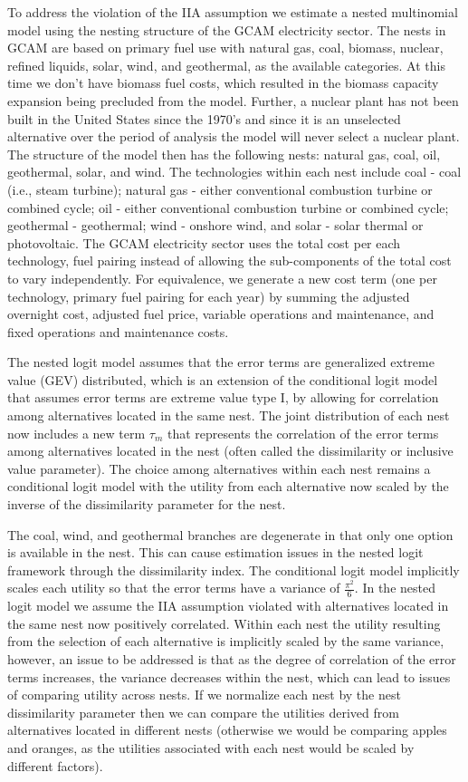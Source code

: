 \documentclass[10pt]{amsart}
\begin{document}
To address the violation of the IIA assumption we estimate a nested multinomial model using the nesting structure of the GCAM electricity sector.
The nests in GCAM are based on primary fuel use with natural gas, coal, biomass, nuclear, refined liquids, solar, wind, and geothermal, as the available categories.
At this time we don't have biomass fuel costs, which resulted in the biomass capacity expansion being precluded from the model.
Further, a nuclear plant has not been built in the United States since the 1970's and since it is an unselected  alternative over the period of analysis the model will never select a nuclear plant. 
The structure of the model then has the following nests: natural gas, coal, oil, geothermal, solar, and wind. 
The technologies within each nest include coal - coal (i.e., steam turbine); natural gas - either conventional combustion turbine or combined cycle; oil - either conventional combustion turbine or combined cycle; geothermal - geothermal; wind - onshore wind, and solar - solar thermal or photovoltaic. 
The GCAM electricity sector uses the total cost per each technology, fuel pairing instead of allowing the sub-components of the total cost to vary independently.
For equivalence, we generate a new cost term (one per technology, primary fuel pairing for each year) by summing the adjusted overnight cost, adjusted fuel price, variable operations and maintenance, and fixed operations and maintenance costs.

The nested logit model assumes that the error terms are generalized extreme value (GEV) distributed, which is an extension of the conditional logit model that assumes error terms are extreme value type I, by allowing for correlation among alternatives located in the same nest. 
The joint distribution of each nest now includes a new term $\tau_m$ that represents the correlation of the error terms among alternatives located in the nest (often called the dissimilarity or inclusive value parameter). 
The choice among alternatives within each nest remains a conditional logit model with the utility from each alternative now scaled by the inverse of the dissimilarity parameter for the nest.  

The coal, wind, and geothermal branches are degenerate in that only one option is available in the nest.
This can cause estimation issues in the nested logit framework through the dissimilarity index.
The conditional logit model implicitly scales each utility so that the error terms have a variance of $\frac{\pi^2}{6}$.
In the nested logit model we assume the IIA assumption violated with alternatives located in the same nest now positively correlated.
Within each nest the utility resulting from the selection of each alternative is implicitly scaled by the same variance, however, an issue to be addressed is that as the degree of correlation of the error terms increases, the variance decreases within the nest, which can lead to issues of comparing utility across nests.
If we normalize each nest by the nest dissimilarity parameter then we can compare the utilities derived from alternatives located in different nests (otherwise we would be comparing apples and oranges, as the utilities associated with each nest would be scaled by different factors)\parencite{heiss2002structural}.
\end{document}
